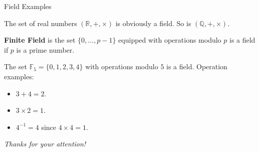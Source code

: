 \documentclass{beamer}
\begin{document}
    \begin{frame}{Field Examples}
      \begin{example}
        The set of real numbers $(\mathbb{R}, +, \times)$ is obviously a field. So is $(\mathbb{Q}, +, \times)$.
    \end{example}

    \begin{definition}
      \textbf{Finite Field} is the set $\{0,\dots,p-1\}$ equipped with operations modulo $p$ is a field if $p$ is a prime number.
    \end{definition}

    \begin{example}
      The set $\mathbb{F}_5 = \{0,1,2,3,4\}$ with operations modulo $5$ is a field. Operation examples:
      \begin{itemize}
        \item $3 + 4 = 2$.
        \item $3 \times 2 = 1$.
        \item $4^{-1} = 4$ since $4 \times 4 = 1$.
      \end{itemize}
    \end{example}
    \end{frame}
  
    \begin{frame}{}
        \centering \Large
        \emph{Thanks for your attention!}
      \end{frame}
\end{document}
